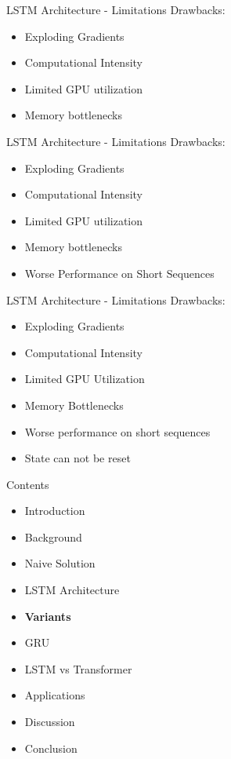 \documentclass[10pt, aspectratio=169]{beamer}
\begin{document}
\begin{frame}[t]{LSTM Architecture - Limitations}
Drawbacks:
\begin{itemize}
    \item Exploding Gradients
    \item Computational Intensity
    \item Limited GPU utilization
    \item Memory bottlenecks
\end{itemize}
\end{frame}

\begin{frame}[t]{LSTM Architecture - Limitations}
Drawbacks:
\begin{itemize}
    \item Exploding Gradients
    \item Computational Intensity
    \item Limited GPU utilization
    \item Memory bottlenecks
    \item Worse Performance on Short Sequences
\end{itemize}
\end{frame}

\begin{frame}[t]{LSTM Architecture - Limitations}
Drawbacks:
\begin{itemize}
    \item Exploding Gradients
    \item Computational Intensity
    \item Limited GPU Utilization
    \item Memory Bottlenecks
    \item Worse performance on short sequences
    \item State can not be reset
\end{itemize}
\end{frame}


\begin{frame}[t]{Contents}
\begin{itemize}
    \item Introduction
    \item Background
    \item Naive Solution
    \item LSTM Architecture
    \item \textbf{Variants}
    \item GRU
    \item LSTM vs Transformer
    \item Applications
    \item Discussion
    \item Conclusion
\end{itemize}
\end{frame}
\end{document}
